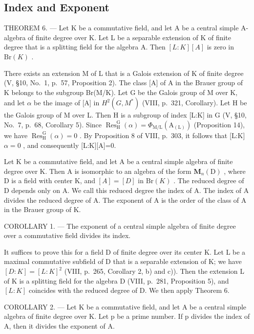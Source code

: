 \subsection{Index and Exponent}

THEOREM 6. --- Let K be a commutative field, and let A be a central simple A-algebra of finite degree over K. Let L be a separable extension of K of finite degree that is a splitting field for the algebra A. Then \([L:K][A]\) is zero in \(\mathrm{Br}(K)\) .

There exists an extension M of L that is a Galois extension of K of finite degree (V, §10, No.~1, p.~57, Proposition 2). The class {[}A{]} of A in the Brauer group of K belongs to the subgroup Br(M/K). Let G be the Galois group of M over K, and let \(\alpha\) be the image of {[}A{]} in \(H^{2}(G,M^{*})\) (VIII, p.~321, Corollary). Let H be the Galois group of M over L. Then H is a subgroup of index {[}L:K{]} in G (V, §10, No.~7, p.~68, Corollary 5). Since \(\operatorname{Res}_{\mathrm{H}}^{\mathrm{G}}(\alpha)=\Phi_{\mathrm{M/L}}(\mathrm{A}_{(\mathrm{L})})\) (Proposition 14), we have \(\operatorname{Res}_{\mathrm{H}}^{\mathrm{G}}(\alpha)=0\) . By Proposition 8 of VIII, p.~303, it follows that {[}L:K{]} \(\alpha=0\) , and consequently {[}L:K{]}{[}A{]}=0.

Let K be a commutative field, and let A be a central simple algebra of finite degree over K. Then A is isomorphic to an algebra of the form \(\mathbf{M}_{n}(\mathrm{D})\) , where D is a field with center K, and \([A]=[D]\) in \(\mathrm{Br}(K)\) . The reduced degree of D depends only on A. We call this reduced degree the index of A. The index of A divides the reduced degree of A. The exponent of A is the order of the class of A in the Brauer group of K.

COROLLARY 1. --- The exponent of a central simple algebra of finite degree over a commutative field divides its index.

It suffices to prove this for a field D of finite degree over its center K. Let L be a maximal commutative subfield of D that is a separable extension of K; we have \([D:K]=[L:K]^{2}\) (VIII, p.~265, Corollary 2, b) and c)). Then the extension L of K is a splitting field for the algebra D (VIII, p.~281, Proposition 5), and \([L:K]\) coincides with the reduced degree of D. We then apply Theorem 6.

COROLLARY 2. --- Let K be a commutative field, and let A be a central simple algebra of finite degree over K. Let p be a prime number. If p divides the index of A, then it divides the exponent of A.


